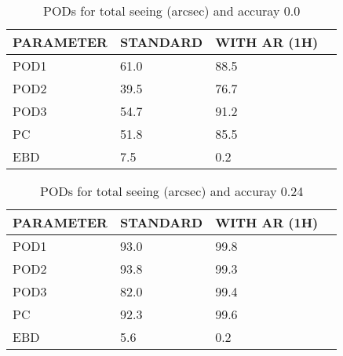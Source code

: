 \documentclass[11pt,english]{article}
\begin{document}
\newpage

\clearpage
\begin{table}[]
\begin{center}
\begin{tabular}{|l|l|l|l|}
\hline
\multicolumn{1}{|c|}{\cellcolor[HTML]{C0C0C0}\textbf{PARAMETER}} & \multicolumn{1}{c|}{\cellcolor[HTML]{C0C0C0}\textbf{STANDARD}} & \multicolumn{1}{c|}{\cellcolor[HTML]{C0C0C0}\textbf{WITH AR (1H)}} \\
\hline
\cellcolor[HTML]{C0C0C0}POD1  & 61.0                                & 88.5         \\
\cellcolor[HTML]{C0C0C0}POD2  & 39.5                                & 76.7         \\
\cellcolor[HTML]{C0C0C0}POD3  & 54.7                                & 91.2         \\
\cellcolor[HTML]{C0C0C0}PC    & 51.8                                  & 85.5           \\
\cellcolor[HTML]{C0C0C0}EBD   & 7.5                                 & 0.2          \\
\hline
\end{tabular}
\caption{PODs for total seeing (arcsec) and accuray 0.0}
\end{center}
\end{table}
\begin{table}[]
\begin{center}
\begin{tabular}{|l|l|l|l|}
\hline
\multicolumn{1}{|c|}{\cellcolor[HTML]{C0C0C0}\textbf{PARAMETER}} & \multicolumn{1}{c|}{\cellcolor[HTML]{C0C0C0}\textbf{STANDARD}} & \multicolumn{1}{c|}{\cellcolor[HTML]{C0C0C0}\textbf{WITH AR (1H)}} \\
\hline
\cellcolor[HTML]{C0C0C0}POD1  & 93.0                                & 99.8         \\
\cellcolor[HTML]{C0C0C0}POD2  & 93.8                                & 99.3         \\
\cellcolor[HTML]{C0C0C0}POD3  & 82.0                                & 99.4         \\
\cellcolor[HTML]{C0C0C0}PC    & 92.3                                  & 99.6           \\
\cellcolor[HTML]{C0C0C0}EBD   & 5.6                                 & 0.2          \\
\hline
\end{tabular}
\caption{PODs for total seeing (arcsec) and accuray 0.24}
\end{center}
\end{table}
\end{document}
